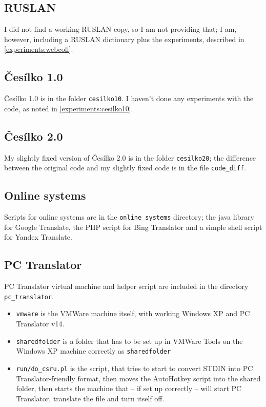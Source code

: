 \subsection{RUSLAN}
I did not find a working RUSLAN copy, so I am not providing that; I am, however, including a RUSLAN dictionary plus the experiments, described in \ref{experiments:webcoll}.

\subsection{Česílko 1.0}
Česílko 1.0 is in the folder \texttt{cesilko10}. I haven't done any experiments with the code, as noted in \ref{experiments:cesilko10}.

\subsection{Česílko 2.0}
My slightly fixed version of Česílko 2.0 is in the folder \texttt{cesilko20}; the difference between the original code and my slightly fixed code is in the file \texttt{code\_diff}.

\subsection{Online systems}
Scripts for online systems are in the \texttt{online\_systems} directory; the java library for Google Translate, the PHP script for Bing Translator and a simple shell script for Yandex Translate.

\subsection{PC Translator}
PC Translator virtual machine and helper script are included in the directory \texttt{pc\_translator}. 
\begin{itemize}
\item \texttt{vmware} is the VMWare machine itself, with working Windows XP and PC Translator v14.
\item \texttt{sharedfolder} is a folder that has to be set up in VMWare Tools on the Windows XP machine correctly as \texttt{sharedfolder}
\item \texttt{run/do\_csru.pl} is the script, that tries to start to convert STDIN into PC Translator-friendly format, then moves the AutoHotkey script into the shared folder, then starts the machine that -- if set up correctly -- will start PC Translator, translate the file and turn itself off.
\end{itemize}

